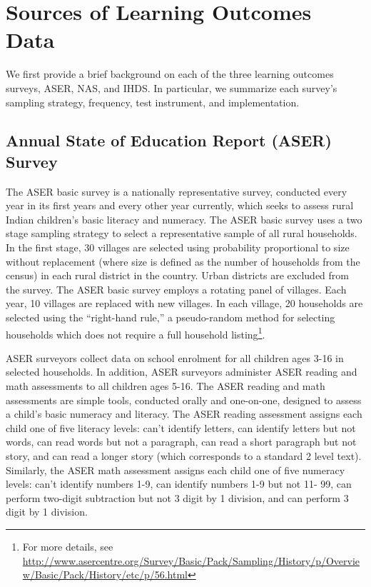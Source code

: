 \documentclass[
  11pt,
]{article}
\begin{document}
\hypertarget{learningdata}{%
\section{Sources of Learning Outcomes Data}\label{learningdata}}

We first provide a brief background on each of the three learning outcomes surveys, ASER, NAS, and IHDS. In particular, we summarize each survey's sampling strategy, frequency, test instrument, and implementation.

\hypertarget{annual-state-of-education-report-aser-survey}{%
\subsection{Annual State of Education Report (ASER) Survey}\label{annual-state-of-education-report-aser-survey}}

The ASER basic survey is a nationally representative survey, conducted every year in its first years and every other year currently, which seeks to assess rural Indian children's basic literacy and numeracy. The ASER basic survey uses a two stage sampling strategy to select a representative sample of all rural households. In the first stage, 30 villages are selected using probability proportional to size without replacement (where size is defined as the number of households from the census) in each rural district in the country. Urban districts are excluded from the survey. The ASER basic survey employs a rotating panel of villages. Each year, 10 villages are replaced with new villages. In each village, 20 households are selected using the ``right-hand rule,'' a pseudo-random method for selecting households which does not require a full household listing\footnote{For more details, see
  \url{http://www.asercentre.org/Survey/Basic/Pack/Sampling/History/p/Overview/Basic/Pack/History/etc/p/56.html}}.

ASER surveyors collect data on school enrolment for all children ages 3-16 in selected households. In addition, ASER surveyors administer ASER reading and math assessments to all children ages 5-16. The ASER reading and math assessments are simple tools, conducted orally and one-on-one, designed to assess a child's basic numeracy and literacy. The ASER reading assessment assigns each child one of five literacy levels: can't identify letters, can identify letters but not words, can read words but not a paragraph, can read a short paragraph but not story, and can read a longer story (which corresponds to a standard 2 level text). Similarly, the ASER math assessment assigns each child one of five numeracy levels: can't identify numbers 1-9, can identify numbers 1-9 but not 11- 99, can perform two-digit subtraction but not 3 digit by 1 division, and can perform 3 digit by 1 division.
\end{document}

